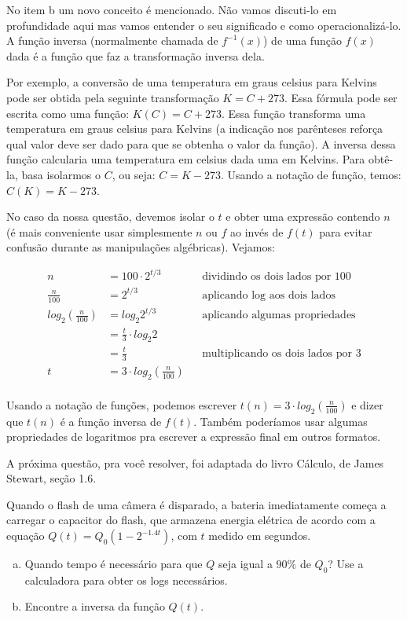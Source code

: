 \documentclass[main_estudante.tex]{subfiles}
\begin{document}
No item b um novo conceito é mencionado. Não vamos discuti-lo em profundidade aqui mas vamos entender o seu significado e como operacionalizá-lo. A função inversa (normalmente chamada de $f^{-1}(x)$) de uma função $f(x)$ dada é a função que faz a transformação inversa dela.

Por exemplo, a conversão de uma temperatura em graus celsius para Kelvins pode ser obtida pela seguinte transformação $K=C+273$. Essa fórmula pode ser escrita como uma função: $K(C)=C+273$. Essa função transforma uma temperatura em graus celsius para Kelvins (a indicação nos parênteses reforça qual valor deve ser dado para que se obtenha o valor da função). A inversa dessa função calcularia uma temperatura em celsius dada uma em Kelvins. Para obtê-la, basa isolarmos o $C$, ou seja: $C=K-273$. Usando a notação de função, temos: $C(K)=K-273$.

No caso da nossa questão, devemos isolar o $t$ e obter uma expressão contendo $n$ (é mais conveniente usar simplesmente $n$ ou $f$ ao invés de $f(t)$ para evitar confusão durante as manipulações algébricas). Vejamos:

\begin{align*}
n & {} = 100 \cdot 2^{t/3} && \text{dividindo os dois lados por 100}\\
\frac{n}{100} & {} = 2^{t/3} && \text{aplicando log aos dois lados} \\
log_2 (\frac{n}{100}) & {} = log_2 2^{t/3} && \text{aplicando algumas propriedades} \\
 & {} = \frac{t}{3} \cdot log_2 2 \\
 & {} = \frac{t}{3} && \text{multiplicando os dois lados por 3}\\
t & {} = 3 \cdot log_2 (\frac{n}{100}) \\
\end{align*}

Usando a notação de funções, podemos escrever $t(n) = 3 \cdot log_2 (\frac{n}{100})$ e dizer que $t(n)$ é a função inversa de $f(t)$. Também poderíamos usar algumas propriedades de logaritmos pra escrever a expressão final em outros formatos.

A próxima questão, pra você resolver, foi adaptada do livro Cálculo, de James Stewart, seção 1.6.

\begin{resolva}
Quando o flash de uma câmera é disparado, a bateria imediatamente começa a carregar o capacitor do flash, que armazena energia elétrica de acordo com a equação $Q(t)=Q_0(1-2^{-1.4t})$, com $t$ medido em segundos.
\begin{enumerate}[a)]
 \item Quando tempo é necessário para que $Q$ seja igual a $90\%$ de $Q_0$? Use a calculadora para obter os logs necessários.
 \item Encontre a inversa da função $Q(t)$.
\end{enumerate}
\end{resolva}
\end{document}
